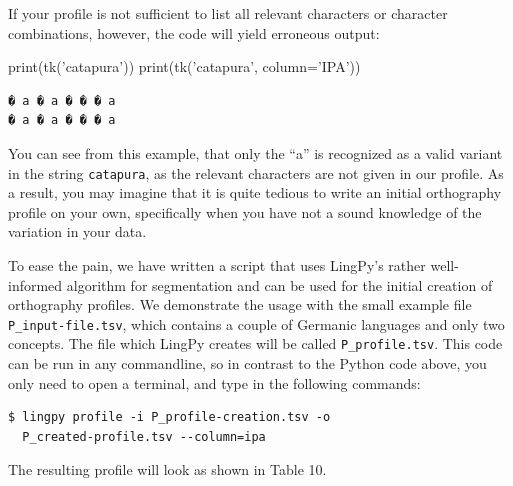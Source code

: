 \documentclass[a4paper,svgnames]{scrartcl}
\newenvironment{Shaded}{}{}
\newcommand{\StringTok}[1]{\textcolor[rgb]{0.25,0.44,0.63}{#1}}
\newcommand{\OperatorTok}[1]{\textcolor[rgb]{0.40,0.40,0.40}{#1}}
\newcommand{\BuiltInTok}[1]{#1}
\newcommand{\NormalTok}[1]{#1}
\begin{document}
If your profile is not sufficient to list all relevant characters or
character combinations, however, the code will yield erroneous output:

\begin{Shaded}
\begin{Highlighting}[]
\BuiltInTok{print}\NormalTok{(tk(}\StringTok{'catapura'}\NormalTok{))}
\BuiltInTok{print}\NormalTok{(tk(}\StringTok{'catapura'}\NormalTok{, column}\OperatorTok{=}\StringTok{'IPA'}\NormalTok{))}
\end{Highlighting}
\end{Shaded}

\begin{verbatim}
� a � a � � � a
� a � a � � � a
\end{verbatim}

You can see from this example, that only the ``a'' is recognized as a
valid variant in the string \texttt{catapura}, as the relevant
characters are not given in our profile. As a result, you may imagine
that it is quite tedious to write an initial orthography profile on your
own, specifically when you have not a sound knowledge of the variation
in your data.

To ease the pain, we have written a script that uses LingPy's rather
well-informed algorithm for segmentation and can be used for the initial
creation of orthography profiles. We demonstrate the usage with the
small example file \texttt{P\_input-file.tsv}, which contains a couple
of Germanic languages and only two concepts. The file which LingPy
creates will be called \texttt{P\_profile.tsv}. This code can be run in
any commandline, so in contrast to the Python code above, you only need
to open a terminal, and type in the following commands:

\begin{verbatim}
$ lingpy profile -i P_profile-creation.tsv -o 
  P_created-profile.tsv --column=ipa
\end{verbatim}

The resulting profile will look as shown in Table 10.
\end{document}
